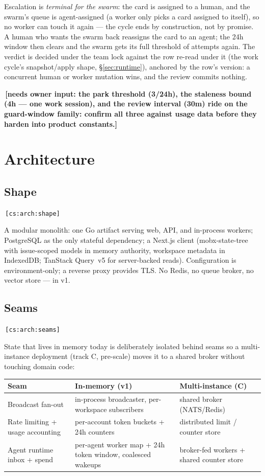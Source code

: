 \documentclass[11pt,a4paper]{report}
\newcommand{\cs}[1]{\,\texttt{\scriptsize[cs:#1]}\label{cs:#1}}
\newcommand{\owner}[1]{\,\textcolor{red!60!black}{\textbf{[needs owner input: #1]}}}
\begin{document}
Escalation is \emph{terminal for the swarm}: the card is assigned to a
human, and the swarm's queue is agent-assigned (a worker only picks a
card assigned to itself), so no worker can touch it again --- the
cycle ends by construction, not by promise. A human who wants the
swarm back reassigns the card to an agent; the 24h window then clears
and the swarm gets its full threshold of attempts again. The verdict
is decided under the team lock against the row re-read under it (the
work cycle's snapshot/apply shape, \S\ref{sec:runtime}), anchored by
the row's version: a concurrent human or worker mutation wins, and the
review commits nothing.

\owner{the park threshold (3/24h), the staleness bound (4h --- one
  work session), and the review interval (30m) ride on the
  guard-window family: confirm all three against usage data before
  they harden into product constants.}

\chapter{Architecture}
\label{ch:arch}

\section{Shape}
\label{sec:shape}
\cs{arch:shape}

A modular monolith: one Go artifact serving web, API, and in-process
workers; PostgreSQL as the only stateful dependency; a Next.js client
(mobx-state-tree with issue-scoped models in memory authority, workspace
metadata in IndexedDB; TanStack Query~v5 for server-backed reads).
Configuration is environment-only; a reverse proxy provides TLS. No Redis,
no queue broker, no vector store --- in v1.

\section{Seams}
\label{sec:seams}
\cs{arch:seams}

State that lives in memory today is deliberately isolated behind seams so
a multi-instance deployment (track C, pre-scale) moves it to a shared
broker without touching domain code:

\begin{center}
\begin{tabular}{@{}p{}p{}p{}@{}}
\toprule
\textbf{Seam} & \textbf{In-memory (v1)} & \textbf{Multi-instance (C)}\\
\midrule
Broadcast fan-out & in-process broadcaster, per-workspace subscribers
  & shared broker (NATS/Redis)\\
Rate limiting + usage accounting & per-account token buckets + 24h
  counters & distributed limit / counter store\\
Agent runtime inbox + spend & per-agent worker map + 24h token window,
  coalesced wakeups & broker-fed workers + shared counter store\\
\bottomrule
\end{tabular}
\end{center}
\end{document}
